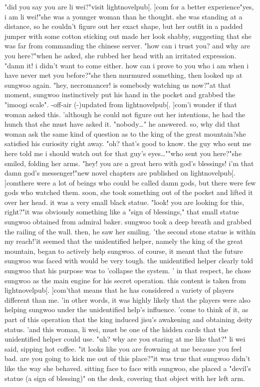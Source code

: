 "did you say you are li wei?"visit lightnovelpub[.
]com for a better experience"yes, i am li wei!"she was a younger woman than he thought.
 she was standing at a distance, so he couldn't figure out her exact shape, but her outfit in a padded jumper with some cotton sticking out made her look shabby, suggesting that she was far from commanding the chinese server.
"how can i trust you? and why are you here?"when he asked, she rubbed her head with an irritated expression.
"damn it! i didn't want to come either.
 how can i prove to you who i am when i have never met you before?"she then murmured something, then looked up at sungwoo again.
"hey, necromancer! is somebody watching us now?"at that moment, sungwoo instinctively put his hand in the pocket and grabbed the "imoogi scale".
-off-air (-)updated from lightnovelpub[.
]com'i wonder if that woman asked this.
'although he could not figure out her intentions, he had the hunch that she must have asked it.
"nobody…" he answered.
 so, why did that woman ask the same kind of question as to the king of the great mountain?she satisfied his curiosity right away.
"oh? that's good to know.
 the guy who sent me here told me i should watch out for that guy's eyes…""who sent you here?"she smiled, folding her arms.
"hey! you are a great hero with god's blessings! i'm that damn god's messenger!"new novel chapters are published on lightnovelpub[.
]comthere were a lot of beings who could be called damn gods, but there were few gods who watched them.
 soon, she took something out of the pocket and lifted it over her head.
it was a very small black statue.
"look! you are looking for this, right?"it was obviously something like a "sign of blessings," that small statue sungwoo obtained from admiral baker.
 sungwoo took a deep breath and grabbed the railing of the wall.
 then, he saw her smiling.
'the second stone statue is within my reach!'it seemed that the unidentified helper, namely the king of the great mountain, began to actively help sungwoo.
 of course, it meant that the future sungwoo was faced with would be very tough.
the unidentified helper clearly told sungwoo that his purpose was to 'collapse the system.
' in that respect, he chose sungwoo as the main engine for his secret operation.
this content is taken from lightnovelpub[.
]com'that means that he has considered a variety of players different than me.
'in other words, it was highly likely that the players were also helping sungwoo under the unidentified help's influence.
'come to think of it, as part of this operation that the king induced jisu's awakening and obtaining deity status.
'and this woman, li wei, must be one of the hidden cards that the unidentified helper could use.
 "uh? why are you staring at me like that?" li wei said, sipping hot coffee.
 "it looks like you are frowning at me because you feel bad.
 are you going to kick me out of this place?"it was true that sungwoo didn't like the way she behaved.
 sitting face to face with sungwoo, she placed a "devil's statue (a sign of blessing)" on the desk, covering that object with her left arm.


